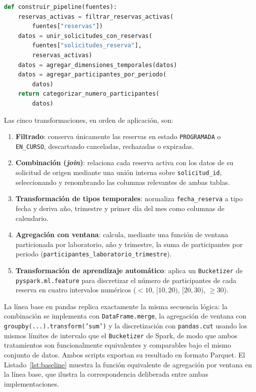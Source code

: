 \documentclass[10pt,twocolumn]{article}
\begin{document}
\begin{lstlisting}[language=Python,caption={Composición de las cinco transformaciones del pipeline (\texttt{spark/pipeline.py}).},label={lst:pipeline}]
def construir_pipeline(fuentes):
    reservas_activas = filtrar_reservas_activas(
        fuentes["reservas"])
    datos = unir_solicitudes_con_reservas(
        fuentes["solicitudes_reserva"],
        reservas_activas)
    datos = agregar_dimensiones_temporales(datos)
    datos = agregar_participantes_por_periodo(
        datos)
    return categorizar_numero_participantes(
        datos)
\end{lstlisting}

Las cinco transformaciones, en orden de aplicación, son:

\begin{enumerate}[leftmargin=*,itemsep=1pt]
  \item \textbf{Filtrado}: conserva únicamente las reservas en estado
  \texttt{PROGRAMADA} o \texttt{EN\_CURSO}, descartando canceladas,
  rechazadas o expiradas.
  \item \textbf{Combinación (\emph{join})}: relaciona cada reserva activa
  con los datos de su solicitud de origen mediante una unión interna sobre
  \texttt{solicitud\_id}, seleccionando y renombrando las columnas
  relevantes de ambas tablas.
  \item \textbf{Transformación de tipos temporales}: normaliza
  \texttt{fecha\_reserva} a tipo fecha y deriva año, trimestre y primer día
  del mes como columnas de calendario.
  \item \textbf{Agregación con ventana}: calcula, mediante una función de
  ventana particionada por laboratorio, año y trimestre, la suma de
  participantes por periodo (\texttt{participantes\_laboratorio\_trimestre}).
  \item \textbf{Transformación de aprendizaje automático}: aplica un
  \texttt{Bucketizer} de \texttt{pyspark.ml.feature} para discretizar el
  número de participantes de cada reserva en cuatro intervalos numéricos
  ($<10$, $[10,20)$, $[20,30)$, $\geq 30$).
\end{enumerate}

La línea base en pandas replica exactamente la misma secuencia lógica: la
combinación se implementa con \texttt{DataFrame.merge}, la agregación de
ventana con \texttt{groupby(...).transform('sum')} y la discretización con
\texttt{pandas.cut} usando los mismos límites de intervalo que el
\texttt{Bucketizer} de Spark, de modo que ambos tratamientos son
funcionalmente equivalentes y comparables bajo el mismo conjunto de datos.
Ambos scripts exportan su resultado en formato Parquet. El
Listado~\ref{lst:baseline} muestra la función equivalente de agregación por
ventana en la línea base, que ilustra la correspondencia deliberada entre
ambas implementaciones.
\end{document}

